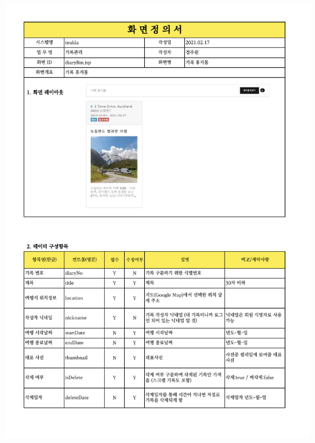 {{{{{{{{{{{{{{{{{{{{{{{{{{{{{{{{{{{{{{{{{\includegraphics[width=20cm]{./Figure/Design/Display/diary/diary_23.pdf} \\
}}}}}}}}}}}}}}}}}}}}}}}}}}}}}}}}}}}}}}}}}
